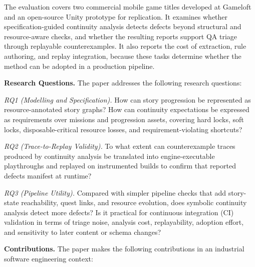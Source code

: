 \documentclass[conference]{IEEEtran}
\begin{document}
The evaluation covers two commercial mobile game titles developed at
Gameloft and an open-source Unity prototype for replication. It examines
whether specification-guided continuity analysis detects defects beyond
structural and resource-aware checks, and whether the resulting reports
support QA triage through replayable counterexamples. It also reports the
cost of extraction, rule authoring, and replay integration, because these
tasks determine whether the method can be adopted in a production
pipeline.

\noindent\textbf{Research Questions.} The paper addresses the following research questions:

\textit{RQ1 (Modelling and Specification).}
How can story progression be represented as resource-annotated story
graphs? How can continuity expectations be expressed as requirements
over missions and progression assets, covering hard locks, soft locks,
disposable-critical resource losses, and requirement-violating shortcuts?

\textit{RQ2 (Trace-to-Replay Validity).}
To what extent can counterexample traces produced by continuity analysis
be translated into engine-executable playthroughs and replayed on
instrumented builds to confirm that reported defects manifest at runtime?

\textit{RQ3 (Pipeline Utility).}
Compared with simpler pipeline checks that add
story-state reachability, quest links, and resource evolution, does
symbolic continuity analysis detect more defects? Is it practical for continuous integration (CI) validation in terms of
triage noise, analysis cost, replayability, adoption effort, and
sensitivity to later content or schema changes?

\noindent\textbf{Contributions.} The paper makes the following contributions in an industrial
software engineering context:
\end{document}
